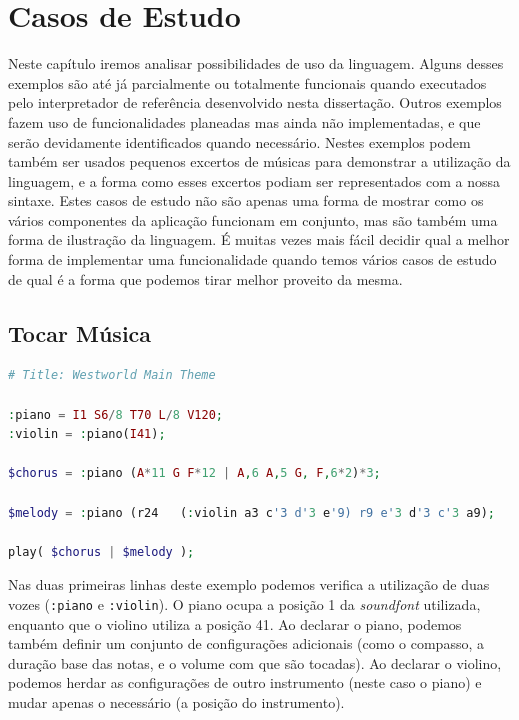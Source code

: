 \chapter{Casos de Estudo}
Neste capítulo iremos analisar possibilidades de uso da linguagem. Alguns desses exemplos são até já parcialmente ou totalmente funcionais quando executados pelo interpretador de referência desenvolvido nesta dissertação. Outros exemplos fazem uso de funcionalidades planeadas mas ainda não implementadas, e que serão devidamente identificados quando necessário.
Nestes exemplos podem também ser usados pequenos excertos de músicas para demonstrar a utilização da linguagem, e a forma como esses excertos podiam ser representados com a nossa sintaxe. Estes casos de estudo não são apenas uma forma de mostrar como os vários componentes da aplicação funcionam em conjunto, mas são também uma forma de ilustração da linguagem. É muitas vezes mais fácil decidir qual a melhor forma de implementar uma funcionalidade quando temos vários casos de estudo de qual é a forma que podemos tirar melhor proveito da mesma.

\section{Tocar Música}
\label{casestudies:westworld}
\begin{lstlisting}[caption=Exemplo da sintaxe para criação de música,language=PHP]
# Title: Westworld Main Theme

:piano = I1 S6/8 T70 L/8 V120;
:violin = :piano(I41);

$chorus = :piano (A*11 G F*12 | A,6 A,5 G, F,6*2)*3;

$melody = :piano (r24   (:violin a3 c'3 d'3 e'9) r9 e'3 d'3 c'3 a9);

play( $chorus | $melody );
\end{lstlisting}


Nas duas primeiras linhas deste exemplo podemos verifica a utilização de duas vozes (\texttt{:piano} e \texttt{:violin}). O piano ocupa a posição 1 da \textit{soundfont} utilizada, enquanto que o violino utiliza a posição 41. Ao declarar o piano, podemos também definir um conjunto de configurações adicionais (como o compasso, a duração base das notas, e o volume com que são tocadas). Ao declarar o violino, podemos herdar as configurações de outro instrumento (neste caso o piano) e mudar apenas o necessário (a posição do instrumento).

